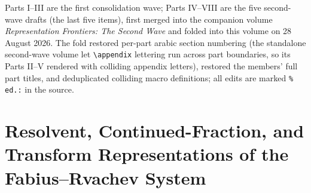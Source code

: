 \documentclass[11pt]{article}
\theoremstyle{definition}
\theoremstyle{remark}
\begin{document}
Parts I--III are the first consolidation wave; Parts IV--VIII are the
five second-wave drafts (the last five items), first merged into the
companion volume \textit{Representation Frontiers: The Second Wave}
and folded into this volume on 28 August 2026.  The fold restored
per-part arabic section numbering (the standalone second-wave volume
let \verb|\appendix| lettering run across part boundaries, so its
Parts II--V rendered with colliding appendix letters), restored the
members' full part titles, and deduplicated colliding macro
definitions; all edits are marked \verb|% ed.:| in the source.

\begin{center}
\end{center}

\clearpage
\part{Resolvent, Continued-Fraction, and Transform Representations of the Fabius--Rvachev System}
\end{document}

